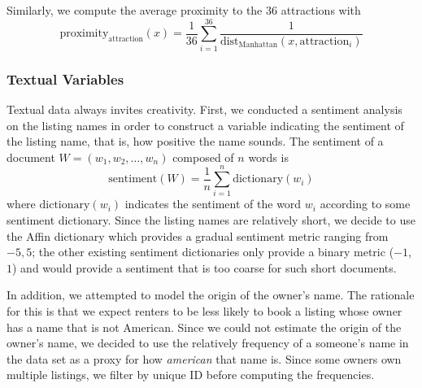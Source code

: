 \documentclass{article}
\begin{document}
Similarly, we compute the average proximity to the $36$ attractions with
$$\text{proximity}_\text{attraction}(x) = \dfrac{1}{36} \sum_{i=1}^{36} \dfrac{1}{\text{dist}_{\text{Manhattan}}(x,\text{attraction}_i)}$$

\subsubsection{Textual Variables}
Textual data always invites creativity. First, we conducted a sentiment analysis on the listing names in order to construct a variable indicating the sentiment of the listing name, that is, how positive the name sounds. The sentiment of a document $W = (w_1, w_2, \dots, w_n)$ composed of $n$ words is
$$\text{sentiment}(W) = \dfrac{1}{n} \sum_{i=1}^{n} \text{dictionary}(w_i)$$
where $\text{dictionary}(w_i)$ indicates the sentiment of the word $w_i$ according to some sentiment dictionary. Since the listing names are relatively short, we decide to use the Affin dictionary which provides a gradual sentiment metric ranging from $-5, 5$; the other existing sentiment dictionaries only provide a binary metric ($-1$, $1$) and would provide a sentiment that is too coarse for such short documents.

In addition, we attempted to model the origin of the owner's name. The rationale for this is that we expect renters to be less likely to book a listing whose owner has a name that is not American. Since we could not estimate the origin of the owner's name, we decided to use the relatively frequency of a someone's name in the data set as a proxy for how \textit{american} that name is. Since some owners own multiple listings, we filter by unique ID before computing the frequencies.
\end{document}
